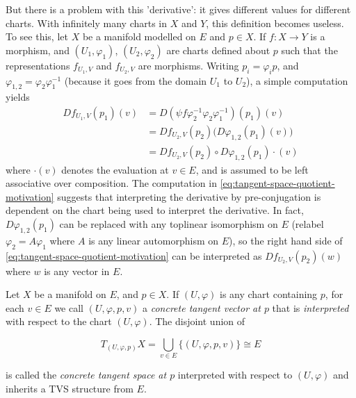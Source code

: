 \documentclass[../main-manifolds.tex]{subfiles}
\begin{document}
But there is a problem with this 'derivative': it gives different values for different charts. With infinitely many charts in $X$ and $Y$, this definition becomes useless. To see this, let $X$ be a manifold modelled on $E$ and $p\in X$. If $f: X\to Y$ is a morphism, and $(U_1,\varphi_1)$, $(U_2,\varphi_2)$ are charts defined about $p$ such that the representations $f_{U_1, V}$ and $f_{U_2, V}$ are morphisms. Writing $p_i = \varphi_i p$, and $\varphi_{1,2}=\varphi_2\varphi_{1}^{-1}$ (because it goes from the domain $U_1$ to $U_2$), a simple computation yields
\begin{align}
    Df_{U_1, V}(p_1)(v) &= D(\psi f \varphi_2^{-1}\varphi_2\varphi_1^{-1})(p_1)(v) \nonumber\\
    &= Df_{U_2,V}(p_2)\biggl(D\varphi_{1,2}(p_1)(v)\biggr)\nonumber\\
    &= Df_{U_2,V}(p_2)\circ D\varphi_{1,2}(p_1)\cdot (v)\label{eq:tangent-space-quotient-motivation}
\end{align}
where $\cdot(v)$ denotes the evaluation at $v\in E$, and is assumed to be left associative over composition. The computation in \cref{eq:tangent-space-quotient-motivation} suggests that interpreting the derivative by pre-conjugation is dependent on the chart being used to interpret the derivative. In fact, $D\varphi_{1,2}(p_1)$ can be replaced with any toplinear isomorphism on $E$ (relabel $\varphi_2 = A\varphi_1$ where $A$ is any linear automorphism on $E$), so the right hand side of \cref{eq:tangent-space-quotient-motivation} can be interpreted as $Df_{U_2,V}(p_2)(w)$ where $w$ is any vector in $E$. 

\begin{definition}
    Let $X$ be a manifold on $E$, and $p\in X$. If $(U,\varphi)$ is any chart containing $p$, for each $v\in E$ we call $(U,\varphi,p,v)$ a \emph{concrete tangent vector at $p$} that is \emph{interpreted} with respect to the chart $(U,\varphi)$. The disjoint union of

    \begin{equation}\label{eq:concrete-tangent-space}
        T_{(U,\varphi,p)}X = \bigcup_{v\in E}\{(U,\varphi,p,v)\}\cong E
    \end{equation}

    is called the \emph{concrete tangent space at $p$} interpreted with respect to $(U,\varphi)$ and inherits a TVS structure from $E$.
\end{definition}
\end{document}
